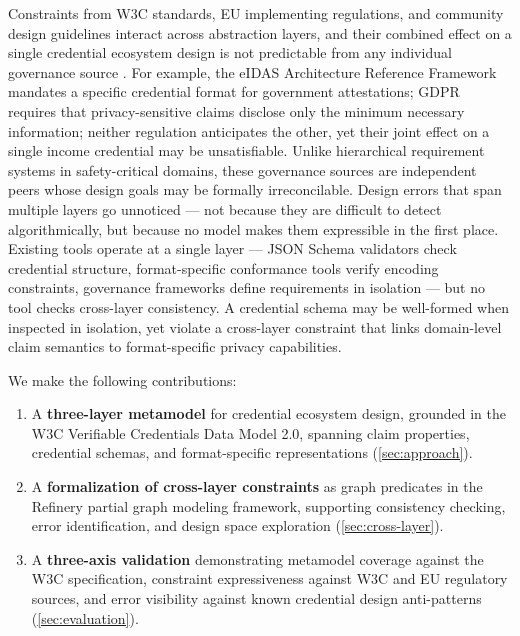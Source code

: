 Constraints from W3C standards, EU implementing regulations, and community design guidelines interact across abstraction layers, and their combined effect on a single credential ecosystem design is not predictable from any individual governance source \citep{mazzocca_survey_2025}. For example, the eIDAS Architecture Reference Framework mandates a specific credential format for government attestations; GDPR requires that privacy-sensitive claims disclose only the minimum necessary information; neither regulation anticipates the other, yet their joint effect on a single income credential may be unsatisfiable. Unlike hierarchical requirement systems in safety-critical domains, these governance sources are independent peers whose design goals may be formally irreconcilable. Design errors that span multiple layers go unnoticed --- not because they are difficult to detect algorithmically, but because no model makes them expressible in the first place. Existing tools operate at a single layer --- JSON Schema validators check credential structure, format-specific conformance tools verify encoding constraints, governance frameworks define requirements in isolation --- but no tool checks cross-layer consistency. A credential schema may be well-formed when inspected in isolation, yet violate a cross-layer constraint that links domain-level claim semantics to format-specific privacy capabilities.


We make the following contributions:

\begin{enumerate}
\def\labelenumi{\arabic{enumi}.}
\tightlist
\item
  A \textbf{three-layer metamodel} for credential ecosystem design, grounded in the W3C Verifiable Credentials Data Model 2.0, spanning claim properties, credential schemas, and format-specific representations (\autoref{sec:approach}).
\item
  A \textbf{formalization of cross-layer constraints} as graph predicates in the Refinery partial graph modeling framework, supporting consistency checking, error identification, and design space exploration (\autoref{sec:cross-layer}).
\item
  A \textbf{three-axis validation} demonstrating metamodel coverage against the W3C specification, constraint expressiveness against W3C and EU regulatory sources, and error visibility against known credential design anti-patterns (\autoref{sec:evaluation}).
\end{enumerate}

